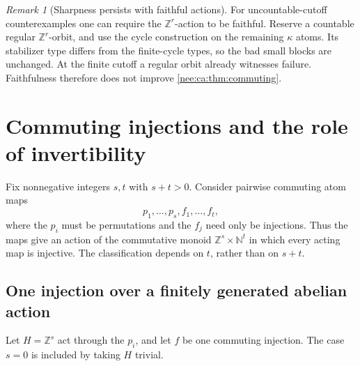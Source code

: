 \documentclass[11pt,letterpaper]{article}
\numberwithin{equation}{section}
\theoremstyle{plain}
\theoremstyle{definition}
\theoremstyle{remark}
\newtheorem{remark}[remark]{Remark}
\newcommand{\NN}{\mathbb N}
\newcommand{\ZZ}{\mathbb Z}
\begin{document}
\begin{remark}[Sharpness persists with faithful actions]
For uncountable-cutoff counterexamples one can require the $\ZZ^r$-action to be faithful. Reserve a countable regular $\ZZ^r$-orbit, and use the cycle construction on the remaining $\kappa$ atoms. Its stabilizer type differs from the finite-cycle types, so the bad small blocks are unchanged. At the finite cutoff a regular orbit already witnesses failure. Faithfulness therefore does not improve \cref{nee:ca:thm:commuting}.
\end{remark}

\section{Commuting injections and the role of invertibility}\label{nee:ca:sec:mixed}

Fix nonnegative integers $s,t$ with $s+t>0$. Consider pairwise commuting atom maps
\[
p_1,\ldots,p_s,f_1,\ldots,f_t,
\]
where the $p_i$ must be permutations and the $f_j$ need only be injections. Thus the maps give an action of the commutative monoid $\ZZ^s\times\NN^t$ in which every acting map is injective. The classification depends on $t$, rather than on $s+t$.

\subsection{One injection over a finitely generated abelian action}

Let $H=\ZZ^s$ act through the $p_i$, and let $f$ be one commuting injection. The case $s=0$ is included by taking $H$ trivial.
\end{document}

